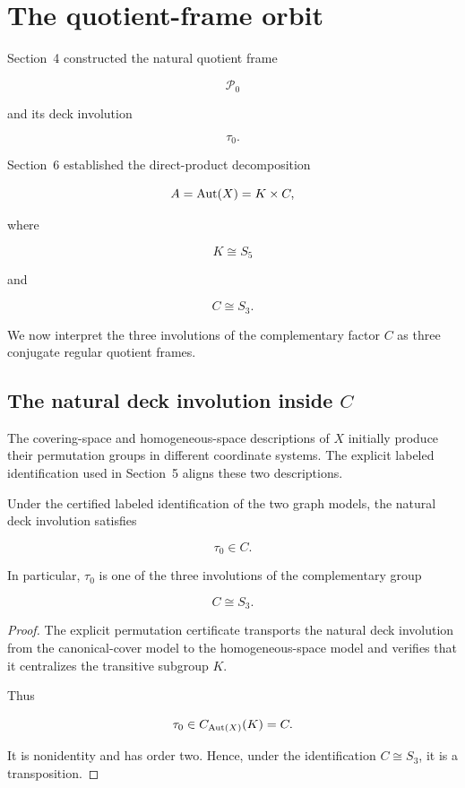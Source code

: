\section{The quotient-frame orbit}

Section~4 constructed the natural quotient frame

\[
\mathcal P_{0}
\]

and its deck involution

\[
\tau_{0}.
\]

Section~6 established the direct-product decomposition

\[
A=\operatorname{Aut}(X)=K\times C,
\]

where

\[
K\cong S_{5}
\]

and

\[
C\cong S_{3}.
\]

We now interpret the three involutions of the complementary factor \(C\)
as three conjugate regular quotient frames.

\subsection{The natural deck involution inside \(C\)}


The covering-space and homogeneous-space descriptions of \(X\) initially
produce their permutation groups in different coordinate systems. The
explicit labeled identification used in Section~5 aligns these two
descriptions.

\begin{proposition}
\label{prop:natural-deck-in-centralizer}

Under the certified labeled identification of the two graph models, the
natural deck involution satisfies

\[
\tau_{0}\in C.
\]

In particular, \(\tau_{0}\) is one of the three involutions of the
complementary group

\[
C\cong S_{3}.
\]

\end{proposition}

\begin{proof}

The explicit permutation certificate transports the natural deck
involution from the canonical-cover model to the homogeneous-space model
and verifies that it centralizes the transitive subgroup \(K\).

Thus

\[
\tau_{0}\in C_{\operatorname{Aut}(X)}(K)=C.
\]

It is nonidentity and has order two. Hence, under the identification
\(C\cong S_{3}\), it is a transposition.
\end{proof}

